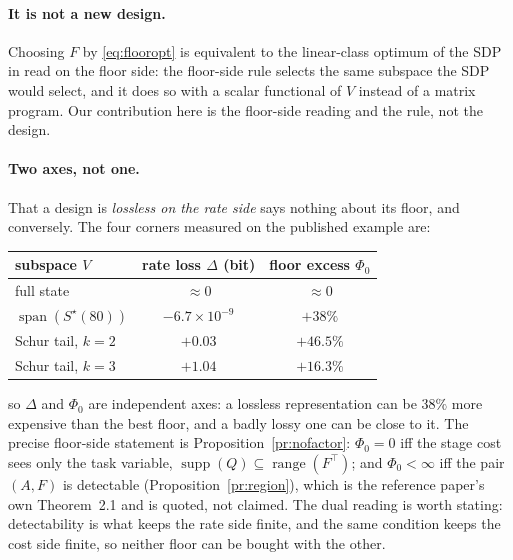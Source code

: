 \documentclass[journal]{IEEEtran}
\theoremstyle{remark}
\begin{document}
\paragraph{It is not a new design.} Choosing $F$ by \eqref{eq:flooropt} is
equivalent to the linear-class optimum of the SDP in \cite{tanaka2015joint} read
on the floor side: the floor-side rule selects the same subspace the SDP would
select, and it does so with a scalar functional of $V$ instead of a matrix
program. Our contribution here is the floor-side reading and the rule, not the
design.

\paragraph{Two axes, not one.} That a design is \emph{lossless on the rate side}
says nothing about its floor, and conversely. The four corners measured on the
published example are:
\begin{center}\footnotesize
\begin{tabular}{@{}lcc@{}}
\toprule
subspace $V$ & rate loss $\Delta$ (bit) & floor excess $\Phi_0$ \\
\midrule
full state                          & $\approx0$        & $\approx0$ \\
$\operatorname{span}(S^{\star}(80))$ & $-6.7\times10^{-9}$ & $+38\%$ \\
Schur tail, $k=2$                   & $+0.03$           & $+46.5\%$ \\
Schur tail, $k=3$                   & $+1.04$           & $+16.3\%$ \\
\bottomrule
\end{tabular}
\end{center}
so $\Delta$ and $\Phi_0$ are independent axes: a lossless representation can be
$38\%$ more expensive than the best floor, and a badly lossy one can be close to
it. The precise floor-side statement is Proposition~\ref{pr:nofactor}: $\Phi_0=0$
iff the stage cost sees only the task variable,
$\operatorname{supp}(Q)\subseteq\operatorname{range}(F^{\top})$; and
$\Phi_0<\infty$ iff the pair $(A,F)$ is detectable
(Proposition~\ref{pr:region}), which is the reference paper's own Theorem~2.1 and
is quoted, not claimed. The dual reading is worth stating: detectability is what
keeps the rate side finite, and the same condition keeps the cost side finite, so
neither floor can be bought with the other.
\end{document}
